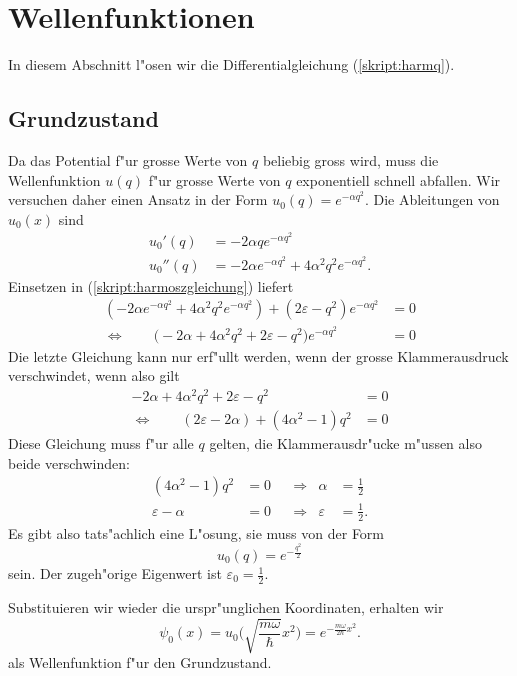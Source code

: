 \section{Wellenfunktionen}
In diesem Abschnitt l"osen wir die Differentialgleichung (\ref{skript:harmq}).
\subsection{Grundzustand\label{skript:hogrundzustand}}
Da das Potential f"ur grosse Werte von $q$ beliebig gross wird,
muss die Wellenfunktion $u(q)$ f"ur grosse Werte von $q$ exponentiell
schnell abfallen.
Wir versuchen daher einen Ansatz in der Form $u_0(q)=e^{-\alpha q^2}$.
Die Ableitungen von
$u_0(x)$ sind
\begin{align*}
u_0'(q)&=-2\alpha qe^{-\alpha q^2}\\
u_0''(q)&=-2\alpha e^{-\alpha q^2}+4\alpha^2q^2e^{-\alpha q^2}.
\end{align*}
Einsetzen in (\ref{skript:harmoszgleichung})  liefert
\begin{align*}
(-2\alpha e^{-\alpha q^2}+4\alpha^2q^2e^{-\alpha q^2})
+
(2\varepsilon - q^2)e^{-\alpha q^2}&=0
\\
\Leftrightarrow\qquad
\biggl(
-2\alpha +4\alpha^2q^2
+
2\varepsilon - q^2
\biggr)e^{-\alpha q^2}
&=0
\end{align*}
Die letzte Gleichung kann nur erf"ullt werden, wenn der grosse Klammerausdruck
verschwindet, wenn also gilt
\begin{align*}
-2\alpha +4\alpha^2q^2
+
2\varepsilon - q^2
&=0
\\
\Leftrightarrow\qquad
(2\varepsilon-2\alpha)
+
(4\alpha^2-1)q^2
&=0
\end{align*}
Diese Gleichung muss f"ur alle $q$ gelten, die Klammerausdr"ucke
m"ussen also beide verschwinden:
\[
\begin{aligned}
(4\alpha^2-1)q^2&=0
&
&\Rightarrow&
\alpha&=\frac12
\\
\varepsilon-\alpha&=0
&
&\Rightarrow&
\varepsilon&=\frac12.
\end{aligned}
\]
Es gibt also tats"achlich eine L"osung, sie muss von der Form
\[
u_0(q)=e^{-\frac{q^2}2}
\]
sein. Der zugeh"orige Eigenwert ist $\varepsilon_0=\frac12$.

Substituieren wir wieder die
urspr"unglichen Koordinaten, erhalten wir
\begin{equation}
\psi_0(x)=u_0\biggl(\sqrt{\frac{m\omega}{\hbar}}x^2\biggr)
=
e^{-\frac{m\omega}{2\hbar}x^2}.
\label{skript:grundzustandwellenfunktion}
\end{equation}
als Wellenfunktion f"ur den Grundzustand.


